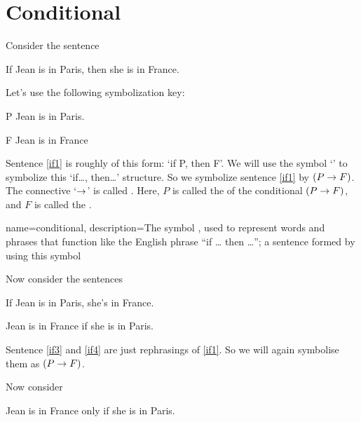 \section{Conditional}
Consider the sentence
	\begin{earg}
		\item[\ex{if1}] If Jean is in Paris, then she is in France.
	\end{earg}
Let's use the following symbolization key:
	\begin{ekey}
		\item[P] Jean is in Paris.
		\item[F] Jean is in France
	\end{ekey}
Sentence \ref{if1} is roughly of this form: `if P, then F'. We will use the symbol `\eif' to symbolize this `if\ldots, then\ldots' structure. So we symbolize sentence \ref{if1} by $(P\rightarrow F)$. 	The connective `$\rightarrow$' is called . Here, $P$ is called the  of the conditional $(P \rightarrow F)$, and $F$ is called the .




{
name=conditional,
description={The symbol \eif, used to represent words and phrases that function like the English phrase ``if \dots{} then \dots''; a sentence formed by using this symbol}
}


\noindent Now consider the sentences
\begin{earg}
		\item[\ex{if3}] If Jean is in Paris, she's in France.
		\item[\ex{if4}] Jean is in France if she is in Paris. 
\end{earg}


Sentence \ref{if3} and \ref{if4} are just rephrasings of \ref{if1}. So we will again symbolise them as $(P\rightarrow F)$.

Now consider
\begin{earg}
		\item[\ex{if2}] Jean is in France only if she is in Paris.
\end{earg}

